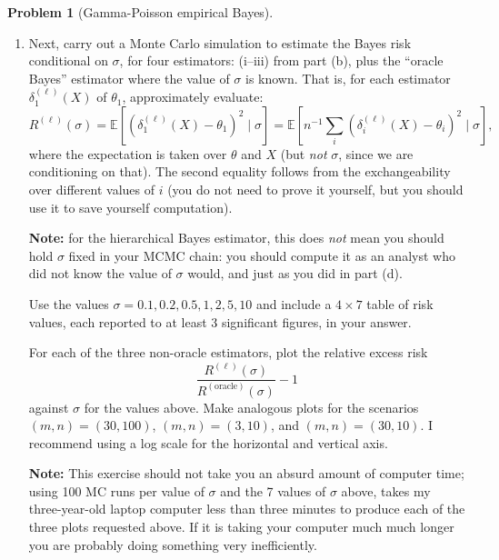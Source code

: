 \documentclass{article}
\newcommand{\EE}{\mathbb{E}}
\theoremstyle{definition}
\newtheorem{problem}{Problem}
\begin{document}
\begin{problem}[Gamma-Poisson empirical Bayes]
\begin{enumerate}[label=(\alph*)]
\item Next, carry out a Monte Carlo simulation to estimate the Bayes risk conditional on $\sigma$, for four estimators: (i--iii) from part (b), plus the ``oracle Bayes'' estimator where the value of $\sigma$ is known. That is, for each estimator $\delta_1^{(\ell)}(X)$ of $\theta_1$, approximately evaluate:
\[
R^{(\ell)}(\sigma) = \EE[(\delta_1^{(\ell)}(X) - \theta_1)^2 \mid \sigma] = \EE\left[n^{-1}\sum_i(\delta_i^{(\ell)}(X) - \theta_i)^2 \mid \sigma\right],
\]
where the expectation is taken over $\theta$ and $X$ (but {\em not} $\sigma$, since we are conditioning on that). The second equality follows from the exchangeability over different values of $i$ (you do not need to prove it yourself, but you should use it to save yourself computation).

{\bf Note:} for the hierarchical Bayes estimator, this does {\em not} mean you should hold $\sigma$ fixed in your MCMC chain: you should compute it as an analyst who did not know the value of $\sigma$ would, and just as you did in part (d).

Use the values $\sigma = 0.1, 0.2, 0.5, 1, 2, 5, 10$ and include a $4\times 7$ table of risk values, each reported to at least 3 significant figures, in your answer.

For each of the three non-oracle estimators, plot the relative excess risk
\[
\frac{R^{(\ell)}(\sigma)}{R^{(\text{oracle})}(\sigma)} - 1
\]
against $\sigma$ for the values above. Make analogous plots for the scenarios $(m,n) = (30,100)$, $(m,n)=(3,10)$, and $(m,n)=(30,10)$. I recommend using a log scale for the horizontal and vertical axis.

{\bf Note:} This exercise should not take you an absurd amount of computer time; using 100 MC runs per value of $\sigma$ and the 7 values of $\sigma$ above, takes my three-year-old laptop computer less than three minutes to produce each of the three plots requested above. If it is taking your computer much much longer you are probably doing something very inefficiently.



\end{enumerate}


\end{problem}
\end{document}
